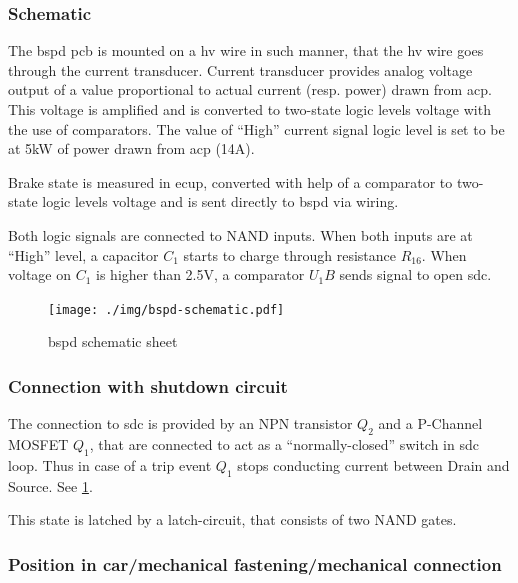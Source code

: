 \subsubsection{Schematic}
The \gls{bspd} \gls{pcb} is mounted on a \gls{hv} wire in such manner, that the \gls{hv} wire goes through the
current transducer. Current transducer provides analog voltage output of a value proportional to
actual current (resp. power) drawn from \gls{acp}. This voltage is amplified and is converted to two-state
logic levels voltage with the use of comparators. The value of “High” current signal logic level
is set to be at 5kW of power drawn from \gls{acp} (14A).

Brake state is measured in \gls{ecup}, converted with help of a comparator to two-state logic levels
voltage and is sent directly to \gls{bspd} via wiring.

Both logic signals are connected to NAND inputs. When both inputs are at “High” level, a
capacitor $C_1$ starts to charge through resistance $R_16$. When voltage on $C_1$ is higher than 2.5V, a
comparator $U_1B$ sends signal to open \gls{sdc}.

\begin{figure}[H]
	\centering
	\texttt{[image: ./img/bspd-schematic.pdf]}
	\caption{\gls{bspd} schematic sheet}
	\label{fig:BSPD-schematic}
\end{figure}

\subsubsection{Connection with shutdown circuit}
The connection to \gls{sdc} is provided by an NPN transistor $Q_2$ and a P-Channel MOSFET $Q_1$, that
are connected to act as a “normally-closed” switch in \gls{sdc} loop. Thus in case of a trip event $Q_1$
stops conducting current between Drain and Source. See \ref{fig:BSPD-schematic}.

This state is latched by a latch-circuit, that consists of two NAND gates.

\subsubsection{Position in car/mechanical fastening/mechanical connection}

